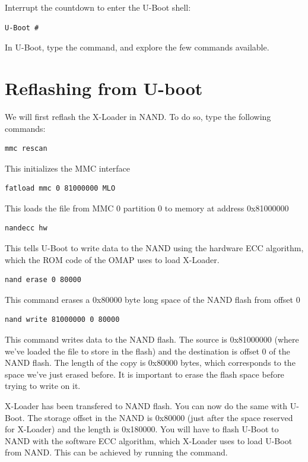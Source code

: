 Interrupt the countdown to enter the U-Boot shell:
\begin{verbatim}
U-Boot #
\end{verbatim}

In U-Boot, type the  command, and explore the few commands available.

\section{Reflashing from U-boot}

We will first reflash the X-Loader in NAND. To do so, type the following commands:

\begin{verbatim}
mmc rescan
\end{verbatim}

This initializes the MMC interface

\begin{verbatim}
fatload mmc 0 81000000 MLO
\end{verbatim}
This loads the file from MMC 0 partition 0 to memory at address 0x81000000

\begin{verbatim}
nandecc hw
\end{verbatim}

This tells U-Boot to write data to the NAND using the hardware ECC
algorithm, which the ROM code of the OMAP uses to load X-Loader.

\begin{verbatim}
nand erase 0 80000
\end{verbatim}

This command erases a 0x80000 byte long space of the NAND flash from offset 0

\begin{verbatim}
nand write 81000000 0 80000
\end{verbatim}

This command writes data to the NAND flash. The source is 0x81000000
(where we've loaded the file to store in the flash) and the
destination is offset 0 of the NAND flash. The length of the copy is
0x80000 bytes, which corresponds to the space we've just erased
before. It is important to erase the flash space before trying to
write on it.

X-Loader has been transfered to NAND flash. You can now do the same
with U-Boot.  The storage offset in the NAND is 0x80000 (just after
the space reserved for X-Loader) and the length is 0x180000. You will
have to flash U-Boot to NAND with the software ECC algorithm, which
X-Loader uses to load U-Boot from NAND. This can be achieved by
running the  command.


